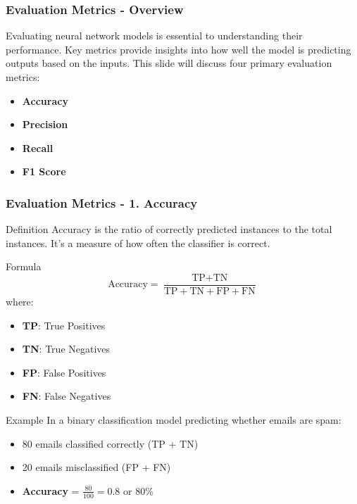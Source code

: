 \documentclass[aspectratio=169]{beamer}
\begin{document}
\begin{frame}[fragile]
    \frametitle{Evaluation Metrics - Overview}
    Evaluating neural network models is essential to understanding their performance. 
    Key metrics provide insights into how well the model is predicting outputs based on the inputs. 
    This slide will discuss four primary evaluation metrics:
    \begin{itemize}
        \item \textbf{Accuracy}
        \item \textbf{Precision}
        \item \textbf{Recall}
        \item \textbf{F1 Score}
    \end{itemize}
\end{frame}

\begin{frame}[fragile]
    \frametitle{Evaluation Metrics - 1. Accuracy}
    \begin{block}{Definition}
        Accuracy is the ratio of correctly predicted instances to the total instances. 
        It's a measure of how often the classifier is correct.
    \end{block}
    
    \begin{block}{Formula}
        \begin{equation}
        \text{Accuracy} = \frac{\text{TP} + \text{TN}}{\text{TP} + \text{TN} + \text{FP} + \text{FN}}
        \end{equation}
        where:
        \begin{itemize}
            \item \textbf{TP}: True Positives
            \item \textbf{TN}: True Negatives
            \item \textbf{FP}: False Positives
            \item \textbf{FN}: False Negatives
        \end{itemize}
    \end{block}

    \begin{block}{Example}
        In a binary classification model predicting whether emails are spam:
        \begin{itemize}
            \item 80 emails classified correctly (TP + TN)
            \item 20 emails misclassified (FP + FN)
            \item \textbf{Accuracy} = \( \frac{80}{100} = 0.8 \) or 80\%
        \end{itemize}
    \end{block}
\end{frame}
\end{document}
